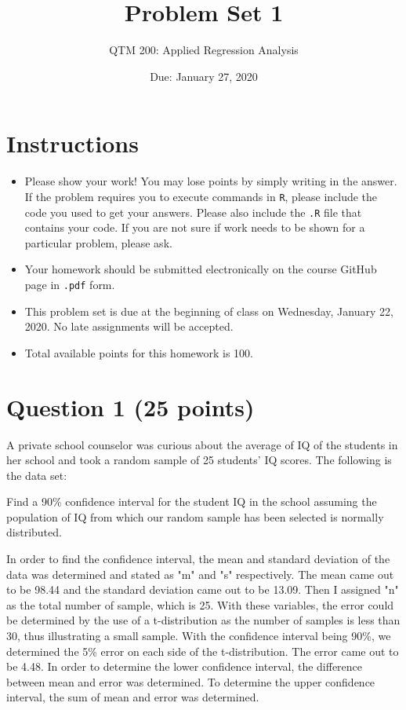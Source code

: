 \documentclass[12pt,letterpaper]{article}
\title{Problem Set 1}
\date{Due: January 27, 2020}
\author{QTM 200: Applied Regression Analysis}
\begin{document}
	\maketitle
	
	\section*{Instructions}
	\begin{itemize}
		\item Please show your work! You may lose points by simply writing in the answer. If the problem requires you to execute commands in \texttt{R}, please include the code you used to get your answers. Please also include the \texttt{.R} file that contains your code. If you are not sure if work needs to be shown for a particular problem, please ask.
		\item Your homework should be submitted electronically on the course GitHub page in \texttt{.pdf} form.
		\item This problem set is due at the beginning of class on Wednesday, January 22, 2020. No late assignments will be accepted.
		\item Total available points for this homework is 100.
	\end{itemize}
	
	\vspace{1cm}
	\section*{Question 1 (25 points)}

A private school counselor was curious about the average of IQ of the students in her school and took a random sample of 25 students' IQ scores. The following is the data set:
\vspace{.5cm}

  

\vspace{.5cm}

\noindent Find a 90\% confidence interval for the student IQ in the school assuming the population of IQ from which our random sample has been selected is normally distributed. 



In order to find the confidence interval, the mean and standard deviation of the data was determined and stated as "m" and "s" respectively. The mean came out to be 98.44 and the standard deviation came out to be 13.09. Then I assigned "n" as the total number of sample, which is 25. With these variables, the error could be determined by the use of a t-distribution as the number of samples is less than 30, thus illustrating a small sample. 
With the confidence interval being 90\%, we determined the 5\% error on each side of the t-distribution. The error came out to be 4.48. In order to determine the lower confidence interval, the difference between mean and error was determined. To determine the upper confidence interval, the sum of mean and error was determined. 
\end{document}
